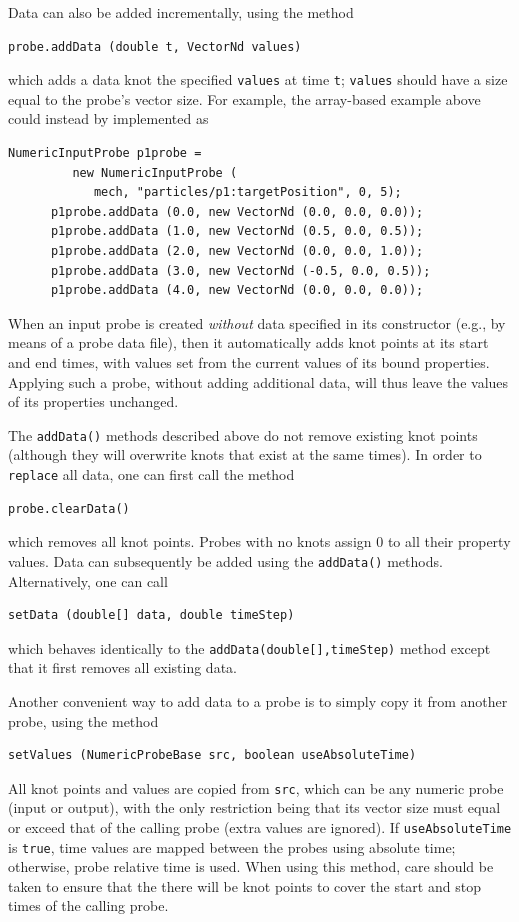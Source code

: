 Data can also be added incrementally, using the method
%
\begin{lstlisting}[]
   probe.addData (double t, VectorNd values)
\end{lstlisting}
%
which adds a data knot the specified {\tt values} at time {\tt t}; {\tt values}
should have a size equal to the probe's vector size. For example, the
array-based example above could instead by implemented as
\begin{lstlisting}[]
      NumericInputProbe p1probe =
         new NumericInputProbe (
            mech, "particles/p1:targetPosition", 0, 5);
      p1probe.addData (0.0, new VectorNd (0.0, 0.0, 0.0));
      p1probe.addData (1.0, new VectorNd (0.5, 0.0, 0.5));
      p1probe.addData (2.0, new VectorNd (0.0, 0.0, 1.0));
      p1probe.addData (3.0, new VectorNd (-0.5, 0.0, 0.5));
      p1probe.addData (4.0, new VectorNd (0.0, 0.0, 0.0));
\end{lstlisting}

When an input probe is created {\it without} data specified in its constructor
(e.g., by means of a probe data file), then it automatically adds knot points
at its start and end times, with values set from the current values of its
bound properties. Applying such a probe, without adding additional data, will
thus leave the values of its properties unchanged.

The {\tt addData()} methods described above do not remove existing knot points
(although they will overwrite knots that exist at the same times). In
order to {\tt replace} all data, one can first call the method
%
\begin{lstlisting}[]
   probe.clearData()
\end{lstlisting}
%
which removes all knot points. Probes with no knots assign 0 to all their
property values.  Data can subsequently be added using the {\tt addData()}
methods. Alternatively, one can call 
\begin{lstlisting}[]
   setData (double[] data, double timeStep)
\end{lstlisting}
%
which behaves identically to the {\tt addData(double[],timeStep)} method
except that it first removes all existing data.

Another convenient way to add data to a probe is to simply copy it from another
probe, using the method
\begin{lstlisting}[]
   setValues (NumericProbeBase src, boolean useAbsoluteTime)
\end{lstlisting}
%
All knot points and values are copied from {\tt src}, which can be any numeric
probe (input or output), with the only restriction being that its vector size
must equal or exceed that of the calling probe (extra values are ignored).  If
{\tt useAbsoluteTime} is {\tt true}, time values are mapped between the probes
using absolute time; otherwise, probe relative time is used.  When using this
method, care should be taken to ensure that the there will be knot points to
cover the start and stop times of the calling probe.


